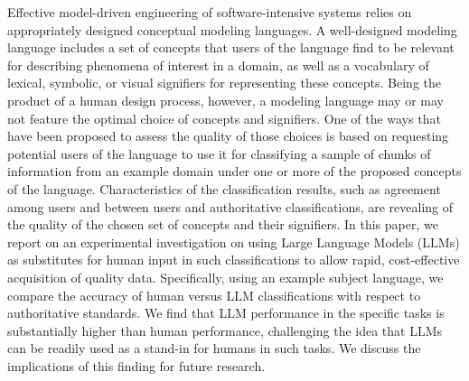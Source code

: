 Effective model-driven engineering of software-intensive systems relies on appropriately designed conceptual modeling languages. A well-designed modeling language includes a set of concepts that users of the language find to be relevant for describing phenomena of interest in a domain, as well as a vocabulary of lexical, symbolic, or visual signifiers for representing these concepts. 
Being the product of a human design process, however, a modeling language may or may not feature the optimal choice of concepts and signifiers. 
One of the ways that have been proposed to assess the quality of those choices is based on requesting potential users of the language to use it for classifying a sample of chunks of information from an example domain under one or more of the proposed concepts of the language. Characteristics of the classification results, such as agreement among users and between users and authoritative classifications, are revealing of the quality of the chosen set of concepts and their signifiers. In this paper, we report on an experimental investigation on using Large Language Models (LLMs) as substitutes for human input in such classifications to allow rapid, cost-effective acquisition of quality data. Specifically, using an example subject language, we compare the accuracy of human versus LLM classifications with respect to authoritative standards. We find that LLM performance in the specific tasks is substantially higher than human performance, challenging the idea that LLMs can be readily used as a stand-in for humans in such tasks. We discuss the implications of this finding for future research.